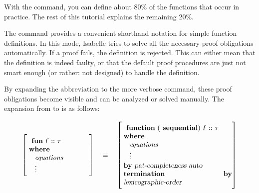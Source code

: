 \begin{isabellebody}
\begin{isamarkuptext}
  With the  command, you can define about 80\% of the
  functions that occur in practice. The rest of this tutorial explains
  the remaining 20\%.%
\end{isamarkuptext}%
\isamarkuptrue%
%
\isamarkuptrue%
%
\begin{isamarkuptext}%
The  command provides a
  convenient shorthand notation for simple function definitions. In
  this mode, Isabelle tries to solve all the necessary proof obligations
  automatically. If a proof fails, the definition is
  rejected. This can either mean that the definition is indeed faulty,
  or that the default proof procedures are just not smart enough (or
  rather: not designed) to handle the definition.

  By expanding the abbreviation to the more verbose  command, these proof obligations become visible and can be analyzed or
  solved manually. The expansion from  to  is as follows:

\end{isamarkuptext}


\[\left[\;\begin{minipage}{0.25\textwidth}\vspace{6pt}
\cmd{fun} \isa{f\ {\isacharcolon}{\isacharcolon}\ {\isasymtau}}\\%
\cmd{where}\\%
\hspace*{2ex}{\it equations}\\%
\hspace*{2ex}\vdots\vspace*{6pt}
\end{minipage}\right]
\quad\equiv\quad
\left[\;\begin{minipage}{0.45\textwidth}\vspace{6pt}
\cmd{function} \isa{{\isacharparenleft}}\cmd{sequential}\isa{{\isacharparenright}\ f\ {\isacharcolon}{\isacharcolon}\ {\isasymtau}}\\%
\cmd{where}\\%
\hspace*{2ex}{\it equations}\\%
\hspace*{2ex}\vdots\\%
\cmd{by} \isa{pat{\isacharunderscore}completeness\ auto}\\%
\cmd{termination by} \isa{lexicographic{\isacharunderscore}order}\vspace{6pt}
\end{minipage}
\right]\]


\end{isabellebody}
